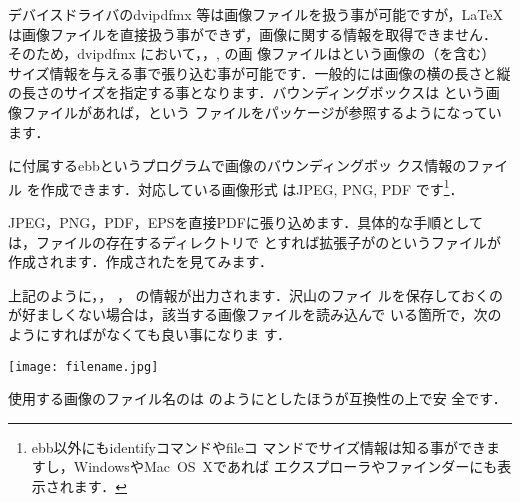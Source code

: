 デバイスドライバのdvipdfmx 等は画像ファイルを扱う事が可能ですが，\LaTeX
は画像ファイルを直接扱う事ができず，画像に関する情報を取得できません．
そのため，dvipdfmx において，，, の画
像ファイルはという画像の（を含む）
%
サイズ情報を与える事で張り込む事が可能です．一般的には画像の横の長さと縦
の長さのサイズを指定する事となります．バウンディングボックスは
という画像ファイルがあれば，という
ファイルをパッケージが参照するようになっています．

\Dvipdfm に付属する{ebb}というプログラムで画像のバウンディングボッ
クス情報のファイル を作成できます．対応している画像形式
はJPEG, PNG, PDF です\footnote{ebb以外にも{identify}コマンドや{file}コ%
マンドでサイズ情報は知る事ができますし，WindowsやMac~OS~Xであれば%
{エクスプローラ}や{ファインダー}にも表示されます．}．

JPEG，PNG，PDF，EPSを直接PDFに張り込めます．具体的な手順として
は，ファイルの存在するディレクトリで
とすれば拡張子がのというファイルが
作成されます．作成されたを見てみます．

\begin{intext}
\end{intext}

上記のように，， ， の情報が出力されます．沢山のファイ
ルを保存しておくのが好ましくない場合は，該当する画像ファイルを読み込んで
いる箇所で，次のようにすればがなくても良い事になりま
す．

\begin{intext}
\texttt{[image: filename.jpg]}
\end{intext}

使用する画像のファイル名のは
のようにとしたほうが互換性の上で安
全です．


